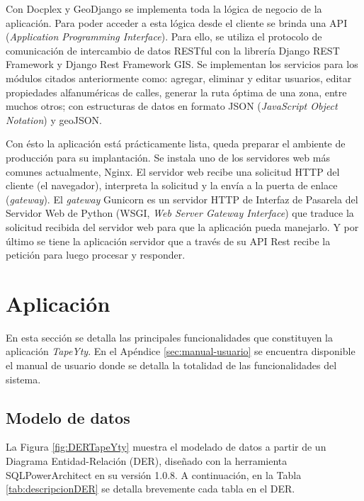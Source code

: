 Con Docplex y GeoDjango se implementa toda la lógica de negocio de la aplicación. Para poder acceder a esta lógica desde el cliente se brinda una API (\textit{Application Programming Interface}). Para ello, se utiliza el protocolo de comunicación de intercambio de datos RESTful con la librería Django REST Framework y Django Rest Framework GIS. Se implementan los servicios para los módulos citados anteriormente como: agregar, eliminar y editar usuarios, editar propiedades alfanuméricas de calles, generar la ruta óptima de una zona, entre muchos otros; con estructuras de datos en formato JSON (\textit{JavaScript Object Notation}) y geoJSON.

Con ésto la aplicación está prácticamente lista, queda preparar el ambiente de producción para su implantación. Se instala uno de los servidores web más comunes actualmente, Nginx. El servidor web recibe una solicitud HTTP del cliente (el navegador), interpreta la solicitud y la envía a la puerta de enlace (\textit{gateway}). El \textit{gateway} Gunicorn es un servidor HTTP de Interfaz de Pasarela del Servidor Web de Python (WSGI, \textit{Web Server Gateway Interface}) que traduce la solicitud recibida del servidor web para que la aplicación pueda manejarlo. Y por último se tiene la aplicación servidor que a través de su API Rest recibe la petición para luego procesar y responder.

\section{Aplicación}

En esta sección se detalla las principales funcionalidades que constituyen la aplicación \textit{TapeYty}. En el Apéndice \ref{sec:manual-usuario} se encuentra disponible el manual de usuario donde se detalla la totalidad de las funcionalidades del sistema.

\subsection{Modelo de datos}

La Figura \ref{fig:DERTapeYty} muestra el modelado de datos a partir de un Diagrama Entidad-Relación (DER), diseñado con la herramienta SQLPowerArchitect \citep{SQLArchitect} en su versión 1.0.8. A continuación, en la Tabla \ref{tab:descripcionDER} se detalla brevemente cada tabla en el DER.

